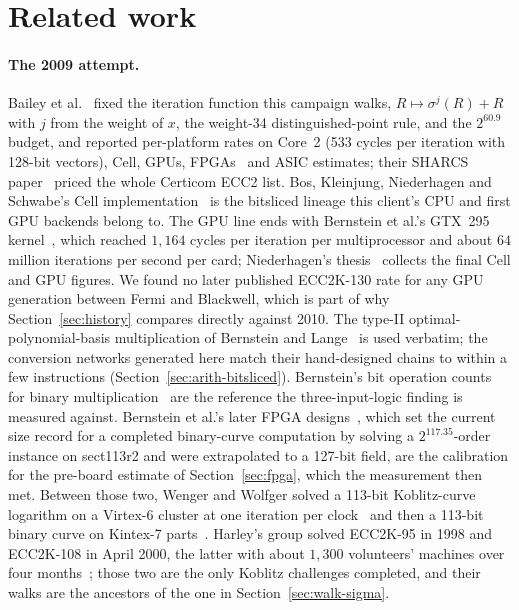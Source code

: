 \section{Related work}
\label{sec:related}

\paragraph{The 2009 attempt.} Bailey et al.~\cite{bailey2009} fixed
the iteration function this campaign walks, $R\mapsto\sigma^j(R)+R$
with $j$ from the weight of $x$, the weight-34 distinguished-point
rule, and the $2^{60.9}$ budget, and reported per-platform rates on
Core~2 (533 cycles per iteration with 128-bit vectors), Cell, GPUs,
FPGAs~\cite{fan2010fpga} and ASIC estimates; their SHARCS
paper~\cite{bailey2009sharcs} priced the whole Certicom ECC2 list.
Bos, Kleinjung, Niederhagen and Schwabe's Cell
implementation~\cite{bos2010cell} is the bitsliced lineage this
client's CPU and first GPU backends belong to. The GPU line ends with
Bernstein et al.'s GTX~295 kernel~\cite{bernstein2010gpu}, which
reached $1{,}164$ cycles per iteration per multiprocessor and about $64$
million iterations per second per card; Niederhagen's
thesis~\cite{niederhagen2012thesis} collects the final Cell and GPU
figures. We found no later published ECC2K-130 rate for any GPU
generation between Fermi and Blackwell, which is part of why
Section~\ref{sec:history} compares directly against 2010. The type-II
optimal-polynomial-basis multiplication of Bernstein and
Lange~\cite{bernsteinlange2010onb} is used verbatim; the conversion
networks generated here match their hand-designed chains to within a
few instructions (Section~\ref{sec:arith-bitsliced}). Bernstein's bit
operation counts for binary multiplication~\cite{bernstein2009batch}
are the reference the three-input-logic finding is measured against.
Bernstein et al.'s later FPGA designs~\cite{bernstein2016fpga}, which
set the current size record for a completed binary-curve computation
by solving a $2^{117.35}$-order instance on sect113r2 and were
extrapolated to a 127-bit field, are the calibration for the pre-board
estimate of Section~\ref{sec:fpga}, which the measurement then met. Between those two, Wenger and Wolfger solved
a 113-bit Koblitz-curve logarithm on a Virtex-6 cluster at one
iteration per clock~\cite{wenger2014sac} and then a 113-bit binary
curve on Kintex-7 parts~\cite{wenger2016jce}.
Harley's group solved ECC2K-95 in 1998 and ECC2K-108 in April 2000,
the latter with about $1{,}300$ volunteers' machines over four
months~\cite{harley1998,harley2000}; those two are the only Koblitz
challenges completed, and their walks are the ancestors of the one in
Section~\ref{sec:walk-sigma}.

